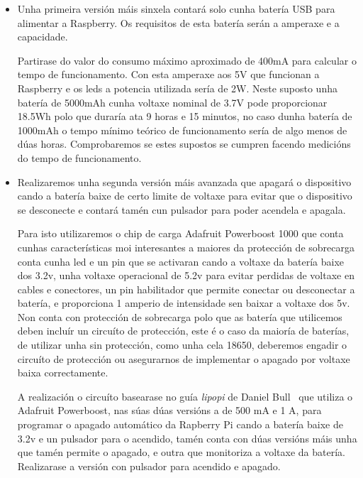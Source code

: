 \begin{itemize}
    \item Unha primeira versión máis sinxela contará solo cunha batería USB para alimentar a Raspberry. Os requisitos de esta batería serán a amperaxe e a capacidade.

    Partirase do valor do consumo máximo aproximado de 400mA para calcular o tempo de funcionamento. Con esta amperaxe aos 5V que funcionan a Raspberry e os leds a potencia utilizada sería de 2W. Neste suposto unha batería de  5000mAh cunha voltaxe nominal de 3.7V pode proporcionar 18.5Wh polo que duraría ata 9 horas e 15 minutos, no caso dunha batería de 1000mAh o tempo mínimo teórico de funcionamento sería de algo menos de dúas horas.
    Comprobaremos se estes supostos se cumpren facendo medicións do tempo de funcionamento.

    \item Realizaremos unha segunda versión máis avanzada que apagará o dispositivo cando a batería baixe de certo limite de voltaxe para evitar que o dispositivo se desconecte e contará tamén cun pulsador para poder acendela e apagala.

    Para isto utilizaremos o chip de carga Adafruit Powerboost 1000 que conta cunhas características moi interesantes a maiores da protección de sobrecarga conta cunha led e un pin que se activaran cando a voltaxe da batería baixe dos 3.2v, unha voltaxe operacional de 5.2v para evitar perdidas de voltaxe en cables e conectores, un pin habilitador que permite conectar ou desconectar a batería, e proporciona 1 amperio de intensidade sen baixar a voltaxe dos 5v. Non conta con protección de sobrecarga polo que as batería que utilicemos deben incluír un circuíto de protección, este é o caso da maioría de baterías, de utilizar unha sin protección, como unha cela 18650, deberemos engadir o circuíto de protección ou asegurarnos de implementar o apagado por voltaxe baixa correctamente.

    A realización o circuíto basearase no guía \emph{lipopi} de Daniel Bull~\cite{bullGuideSettingLiPo2019} que utiliza o Adafruit Powerboost, nas súas dúas versións a de 500 mA e 1 A, para programar o apagado automático da Rapberry Pi cando a batería baixe de 3.2v e un pulsador para o acendido, tamén conta con dúas versións máis unha que tamén permite o apagado, e outra que monitoriza a voltaxe da batería. Realizarase a versión con pulsador para acendido e apagado.


\end{itemize}
